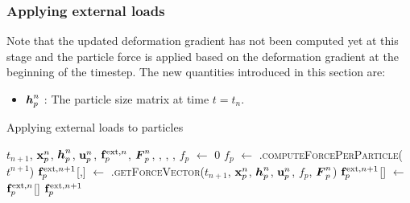 \subsubsection{Applying external loads}
Note that the updated deformation gradient has not been computed yet at this stage and the 
particle force is applied based on the deformation gradient at the beginning of the timestep.
The new quantities introduced in this section are:
\begin{itemize} 
  \setlength\itemsep{1pt}
  \item $\boldsymbol{h}_p^n$ : {\Ochre The particle size matrix at time $t = t_n$.}
\end{itemize}
\begin{breakablealgorithm}
  \caption{Applying external loads to particles}
  \begin{algorithmic}[1]
    \Require $t_{n+1}$, $\mathbf{x}_p^n$, $\boldsymbol{h}_p^n$, $\mathbf{u}_p^n$, $\mathbf{f}^{\text{ext},n}_p$, $\boldsymbol{F}_p^n$,
             , , 
             , 
      \State $f_p$ $\leftarrow$ $0$
        \State $f_p$ $\leftarrow$ .\textsc{computeForcePerParticle}($t^{n+1}$)
      \EndIf
            \State $\mathbf{f}^{\text{ext},n+1}_p$[\TTmatl,\TTpart] $\leftarrow$ 
               .\textsc{getForceVector}($t_{n+1}$, $\mathbf{x}_p^n$, $\boldsymbol{h}_p^n$, $\mathbf{u}_p^n$, \WWRP
                  $f_p$, $\boldsymbol{F}_p^{n}$)
          \EndFor
        \Else
          \State $\mathbf{f}^{\text{ext},n+1}_p$[\TTmatl] $\leftarrow$ $\mathbf{f}^{\text{ext},n}_p$[\TTmatl]
        \EndIf
      \EndFor
      \State \Return $\mathbf{f}_p^{\text{ext},n+1}$
    \EndProcedure
  \end{algorithmic}
\end{breakablealgorithm}

